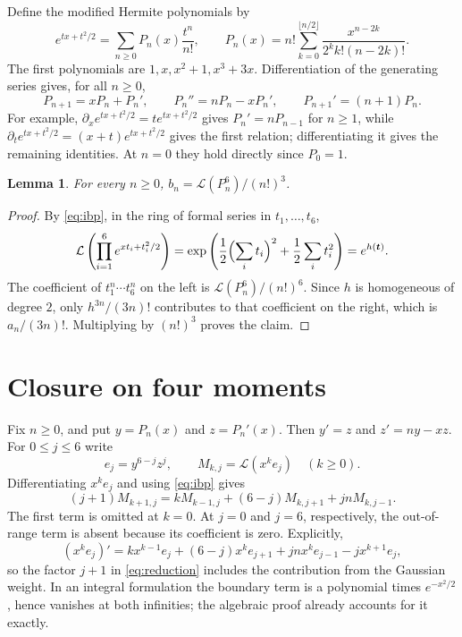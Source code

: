 \documentclass[11pt]{article}
\newtheorem{lemma}[theorem]{Lemma}
\newcommand{\Lfun}{\mathcal L}
\newcommand{\bb}{\boldsymbol}
\begin{document}
Define the modified Hermite polynomials by
\begin{equation}\label{eq:polynomials}
 e^{tx+t^2/2}=\sum_{n\geq0}P_n(x)\frac{t^n}{n!},\qquad
 P_n(x)=n!\sum_{k=0}^{\lfloor n/2\rfloor}
 \frac{x^{n-2k}}{2^k k!(n-2k)!}.
\end{equation}
The first polynomials are $1,x,x^2+1,x^3+3x$.
Differentiation of the generating series gives, for all $n\geq0$,
\begin{equation}\label{eq:hermite}
 P_{n+1}=xP_n+P_n',\qquad
 P_n''=nP_n-xP_n',\qquad P_{n+1}'=(n+1)P_n.
\end{equation}
For example, $\partial_x e^{tx+t^2/2}=t e^{tx+t^2/2}$ gives
$P_n'=nP_{n-1}$ for $n\geq1$, while
$\partial_t e^{tx+t^2/2}=(x+t)e^{tx+t^2/2}$ gives the first
relation; differentiating it gives the remaining identities.
At $n=0$ they hold directly since $P_0=1$.

\begin{lemma}\label{lem:moment}
For every $n\geq0$, $b_n=\Lfun(P_n^6)/(n!)^3$.
\end{lemma}
\begin{proof}
By \eqref{eq:ibp}, in the ring of formal series in $t_1,\ldots,t_6$,
\[
 \Lfun\left(\prod_{i=1}^6 e^{xt_i+t_i^2/2}\right)
 =\exp\left(\frac12\Bigl(\sum_i t_i\Bigr)^2+
             \frac12\sum_i t_i^2\right)=e^{h(\bb t)}.
\]
The coefficient of $t_1^n\cdots t_6^n$ on the left is
$\Lfun(P_n^6)/(n!)^6$. Since $h$ is homogeneous of degree $2$,
only $h^{3n}/(3n)!$ contributes to that coefficient on the right,
which is $a_n/(3n)!$. Multiplying by $(n!)^3$ proves the claim.
\end{proof}

\section{Closure on four moments}
Fix $n\geq0$, and put $y=P_n(x)$ and $z=P_n'(x)$.
Then $y'=z$ and $z'=ny-xz$. For $0\leq j\leq6$ write
\[
 e_j=y^{6-j}z^j,\qquad M_{k,j}=\Lfun(x^ke_j)\quad(k\geq0).
\]
Differentiating $x^ke_j$ and using \eqref{eq:ibp} gives
\begin{equation}\label{eq:reduction}
 (j+1)M_{k+1,j}=kM_{k-1,j}+(6-j)M_{k,j+1}+jnM_{k,j-1}.
\end{equation}
The first term is omitted at $k=0$. At $j=0$ and $j=6$, respectively,
the out-of-range term is absent because its coefficient is zero.
Explicitly,
\[
 (x^ke_j)'=kx^{k-1}e_j+(6-j)x^ke_{j+1}
                 +jnx^ke_{j-1}-jx^{k+1}e_j,
\]
so the factor $j+1$ in \eqref{eq:reduction} includes the contribution
from the Gaussian weight. In an integral formulation the boundary term
is a polynomial times $e^{-x^2/2}$, hence vanishes at both infinities;
the algebraic proof already accounts for it exactly.
\end{document}
